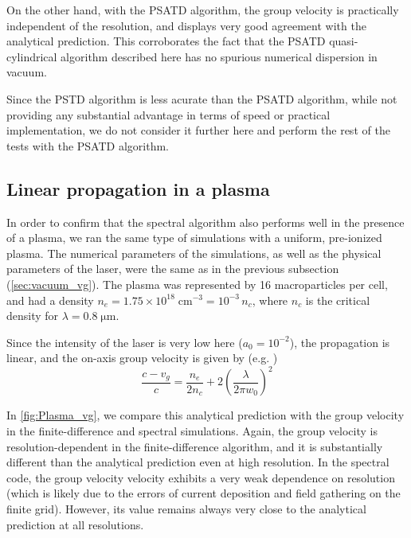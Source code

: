 \documentclass[1p,times]{elsarticle}
\begin{document}
On the other hand, with the PSATD algorithm, the group velocity is 
practically independent of the resolution, and
displays very good agreement with the analytical prediction. 
This corroborates the fact that the PSATD quasi-cylindrical algorithm
described here has no spurious numerical dispersion in vacuum.

Since the PSTD algorithm is less acurate than the PSATD algorithm,
while not providing any substantial advantage in terms of speed or
practical implementation, we do not consider it further here and
perform the rest of the tests with the PSATD algorithm.


\subsection{Linear propagation in a plasma}
\label{sec:linear_plasma}

In order to confirm that the spectral algorithm also performs well in
the presence of a plasma, we ran the same type of simulations with a
uniform, pre-ionized plasma. The numerical parameters of the
simulations, as well as the physical parameters of the laser, 
were the same as in the previous subsection
(\cref{sec:vacuum_vg}). The plasma was represented by 16
macroparticles per cell, and had a density $n_e = 1.75\times
10^{18}\;\mathrm{cm}^{-3} = 10^{-3}\,n_c$, where $n_c$ is the critical
density for $\lambda=0.8\;\mathrm{\mu m}$.

Since the intensity of the laser is very low here ($a_0 = 10^{-2}$),
the propagation is linear, and the on-axis group velocity is given by
(e.g. \cite{Esarey1999})
\begin{equation} 
\label{eq:plasma_vg}
\frac{c-v_g}{c} = \frac{n_e}{2n_c} + 2\left( \frac{\lambda}{2\pi w_0} \right)^2
\end{equation}

In \cref{fig:Plasma_vg}, we compare this analytical prediction with the group velocity in the
finite-difference and spectral simulations. Again, the
group velocity is resolution-dependent in the finite-difference
algorithm, and it is substantially different than the analytical
prediction even at high resolution. In the spectral code, the group
velocity velocity exhibits a very weak dependence on resolution
(which is likely due to the errors of current deposition and field
gathering on the finite grid). However, its value remains always very
close to the analytical prediction at all resolutions.
\end{document}
